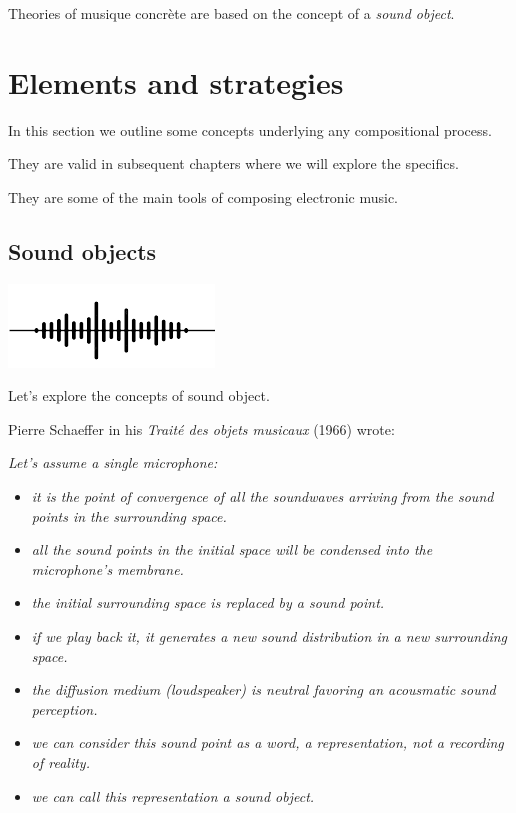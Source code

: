 Theories of musique concrète are based on the concept of a \textit{sound object}.

\section{Elements and strategies}\label{elements-and-strategies}

In this section we outline some concepts underlying any compositional process.

They are valid in subsequent chapters where we will explore the
specifics.

They are some of the main tools of composing electronic music.

\subsection{Sound objects}\label{sound-objects}

\begin{center}
\includegraphics[scale=0.4]{../img/sound.png}
\end{center}

Let's explore the concepts of sound object.

Pierre Schaeffer in his \textit{Traité des objets musicaux} (1966) wrote:

\textit{Let's assume a single microphone:}

\begin{itemize}
\tightlist
\item \textit{it is the point of convergence of all the soundwaves arriving from the sound points in the surrounding space.}
\item \textit{all the sound points in the initial space will be condensed into the microphone's membrane.}
\item \textit{the initial surrounding space is replaced by a sound point.}
\item \textit{if we play back it, it generates a new sound distribution in a new surrounding space.}
\item \textit{the diffusion medium (loudspeaker) is neutral favoring an acousmatic sound perception.}
\item \textit{we can consider this sound point as a word, a representation, not a recording of reality.}
\item \textit{we can call this representation a \textit{sound object}.}
\end{itemize}

